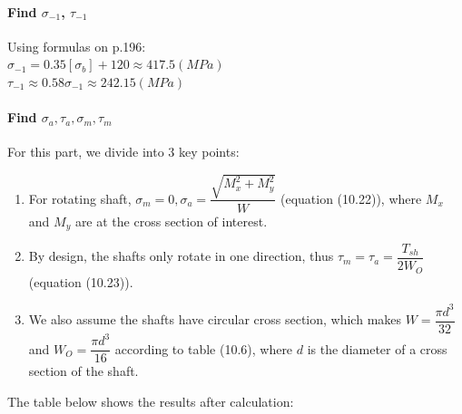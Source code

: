 \paragraph{Find $ \sigma_{-1}$, $ \tau_{-1} $} Using formulas on p.196:\\
$ \sigma_{-1} = 0.35[\sigma_b] + 120 \approx 417.5 \unit{(MPa)} $\\
$ \tau_{-1} \approx 0.58\sigma_{-1} \approx 242.15 \unit{(MPa)} $

\paragraph{Find $ \sigma_{a}, \tau_{a}, \sigma_{m}, \tau_{m} $} For this part, we divide into 3 key points:
\begin{enumerate}
	\item For rotating shaft, $ \sigma_{m} = 0, \sigma_a = \dfrac{\sqrt{M_x^2+M_y^2}}{W} $ (equation (10.22)), where $ M_x $ and $ M_y $ are at the cross section of interest.
	\item By design, the shafts only rotate in one direction, thus $ \tau_m = \tau_a = \dfrac{T_{sh}}{2W_O} $ (equation (10.23)).
	\item We also assume the shafts have circular cross section, which makes $ W = \dfrac{\pi d^3}{32} $ and $ W_O = \dfrac{\pi d^3}{16} $ according to table (10.6), where $ d $ is the diameter of a cross section of the shaft.
\end{enumerate}
The table below shows the results after calculation:
